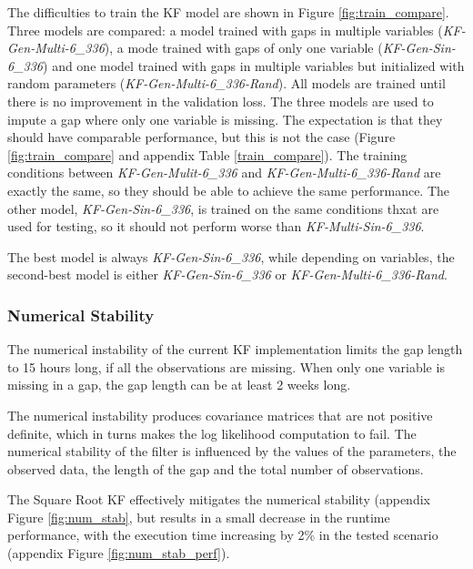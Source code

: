 \documentclass{article}
\begin{document}
The difficulties to train the KF model are shown in Figure \ref{fig:train_compare}.
Three models are compared: a model trained with gaps in multiple variables (\textit{KF-Gen-Multi-6\_336}), a mode trained with gaps of only one variable (\textit{KF-Gen-Sin-6\_336}) and one model trained with gaps in multiple variables but initialized with random parameters (\textit{KF-Gen-Multi-6\_336-Rand}).
All models are trained until there is no improvement in the validation loss. The three models are used to impute a gap where only one variable is missing.
The expectation is that they should have comparable performance, but this is not the case (Figure \ref{fig:train_compare} and appendix Table \ref{train_compare}). The training conditions between \textit{KF-Gen-Mulit-6\_336} and \textit{KF-Gen-Multi-6\_336-Rand} are exactly the same, so they should be able to achieve the same performance. The other model, \textit{KF-Gen-Sin-6\_336}, is trained on the same conditions thxat are used for testing, so it should not perform worse than \textit{KF-Multi-Sin-6\_336}.

The best model is always \textit{KF-Gen-Sin-6\_336}, while depending on variables, the second-best model is either \textit{KF-Gen-Sin-6\_336} or \textit{KF-Gen-Multi-6\_336-Rand}.

\subsubsection{Numerical Stability} The numerical instability of the current KF implementation limits the gap length to 15 hours long, if all the observations are missing. When only one variable is missing in a gap, the gap length can be at least 2 weeks long.

The numerical instability produces covariance matrices that are not positive definite, which in turns makes the log likelihood computation to fail. The numerical stability of the filter is influenced by the values of the parameters, the observed data, the length of the gap and the total number of observations.

The Square Root KF effectively mitigates the numerical stability (appendix Figure \ref{fig:num_stab}, but results in a small decrease in the runtime performance, with the execution time increasing by 2\% in the tested scenario (appendix Figure \ref{fig:num_stab_perf}).
\end{document}

